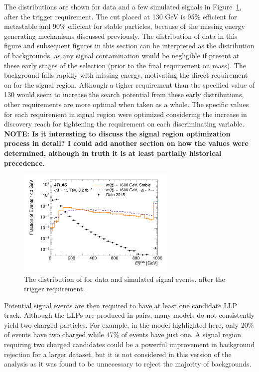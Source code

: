 The \met distributions are shown for data and a few simulated signals in Figure~\ref{fig:nm1_met}, after the trigger requirement.
The cut placed at 130 GeV is 95\% efficient for metastable and 90\% efficient for stable particles, because of the missing energy generating mechanisms discussed previously.
The distribution of data in this figure and subsequent figures in this section can be interpreted as the distribution of backgrounds, as any signal contamination would be negligible if present at these early stages of the selection (prior to the final requirement on mass). 
The background falls rapidly with missing energy, motivating the direct requirement on \met for the signal region.
Although a tigher requirement than the specified value of 130 \GeV would seem to increase the search potential from these early distributions, other requirements are more optimal when taken as a whole.
The specific values for each requirement in signal region were optimized considering the increase in discovery reach for tightening the requirement on each discriminating variable. \textbf{NOTE: Is it interesting to discuss the signal region optimization process in detail? I could add another section on how the values were determined, although in truth it is at least partially historical precedence.}

\begin{figure}[h]
\centering
\includegraphics[width=0.68\textwidth]{figures/selection_met_nm1_log.pdf}
\caption{The distribution of \met for data and simulated signal events, after the trigger requirement.}
\label{fig:nm1_met}
\end{figure}

Potential signal events are then required to have at least one candidate \ac{LLP} track.
Although the \acp{LLP} are produced in pairs, many models do not consistently yield two charged particles.
For example, in the \rhadron model highlighted here, only 20\% of events have two charged \rhadrons while 47\% of events have just one.
A signal region requiring two charged candidates could be a powerful improvement in background rejection for a larger dataset, but it is not considered in this version of the analysis as it was found to be unnecessary to reject the majority of backgrounds.

